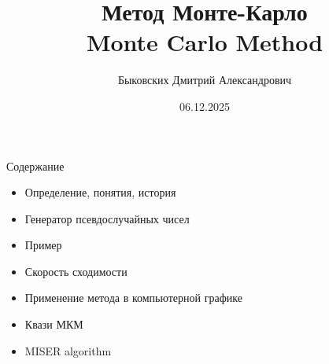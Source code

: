 \documentclass{beamer}
\title[ММК]{Метод Монте-Карло \\ Monte Carlo Method}
\author[Быковских Д.А.]{Быковских Дмитрий Александрович}
\date{06.12.2025}
\begin{document}
	\begin{frame}
		\titlepage
	\end{frame}
	\begin{frame}{Содержание}
		\begin{itemize}
			\item 
			Определение, понятия, история
			\item
			Генератор псевдослучайных чисел
			\item
			Пример
			\item 
			Скорость сходимости
			\item 
			Применение метода в компьютерной графике
			\item
			Квази МКМ
			\item
			MISER algorithm
		\end{itemize}

		\note{
					
					
			
		}
	\end{frame}
\end{document}
